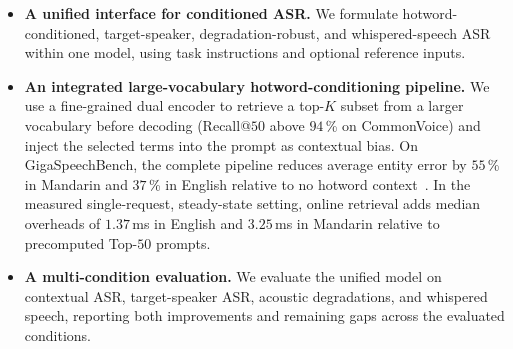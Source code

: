 \begin{itemize}
  \item \textbf{A unified interface for conditioned ASR.}
        We formulate hotword-conditioned, target-speaker,
        degradation-robust, and whispered-speech ASR within one model,
        using task instructions and optional reference inputs.
  \item \textbf{An integrated large-vocabulary hotword-conditioning pipeline.}
        We use a fine-grained dual encoder to retrieve a top-$K$ subset from a
        larger vocabulary before decoding (Recall@$50$ above $94$\,\% on
        CommonVoice) and inject the selected terms into the prompt as
        contextual bias. On GigaSpeechBench, the complete pipeline reduces
        average entity error by $55$\,\% in Mandarin and $37$\,\% in English
        relative to no hotword context~\cite{tu2026gigaspeechbench}. In the
        measured single-request, steady-state setting, online retrieval adds
        median overheads of $1.37$\,ms in English and $3.25$\,ms in Mandarin
        relative to precomputed Top-$50$ prompts.
  \item \textbf{A multi-condition evaluation.}
        We evaluate the unified model on contextual ASR,
        target-speaker ASR, acoustic degradations, and whispered
        speech, reporting both improvements and remaining gaps across
        the evaluated conditions.
\end{itemize}
